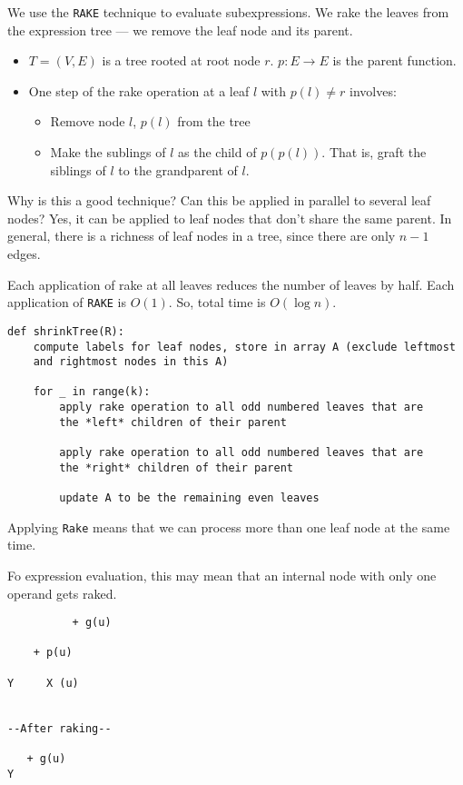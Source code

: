 We use the \texttt{RAKE} technique to evaluate subexpressions. We rake the
leaves from the expression tree --- we remove the leaf node and its parent.

\begin{itemize}
\item $T = (V, E)$ is a tree rooted at root node $r$. $p: E \to E$ is the 
parent function.
\item One step of the rake operation at a leaf $l$ with $p(l) \neq r$ involves:
    \begin{itemize}
    \item Remove node $l$, $p(l)$ from the tree
    \item Make the sublings of $l$ as the child of $p(p(l))$. That is, graft
    the siblings of $l$ to the grandparent of $l$.
    \end{itemize}
\end{itemize}

Why is this a good technique? Can this be applied in parallel to several leaf
nodes? Yes, it can be applied to leaf nodes that don't share the same parent.
In general, there is a richness of leaf nodes in a tree, since there
are only $n - 1$ edges.

Each application of rake at all leaves reduces the  number of leaves by half.
Each application of \texttt{RAKE} is $O(1)$. So, total time is $O(\log n)$.


\begin{verbatim}
def shrinkTree(R):
    compute labels for leaf nodes, store in array A (exclude leftmost
    and rightmost nodes in this A)

    for _ in range(k):
        apply rake operation to all odd numbered leaves that are
        the *left* children of their parent

        apply rake operation to all odd numbered leaves that are
        the *right* children of their parent

        update A to be the remaining even leaves
\end{verbatim}

Applying \texttt{Rake} means that we can process more than one leaf node
at the same time.

Fo expression evaluation, this may mean that an internal node with 
only one operand gets raked.

\begin{verbatim}
          + g(u)
  
    + p(u) 

Y     X (u)


--After raking--

   + g(u)
Y
\end{verbatim}


